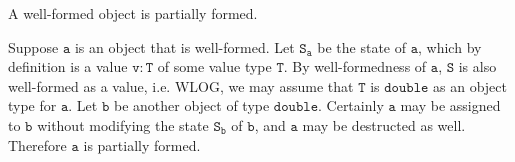 \begin{Lemma}
    A well-formed object is partially formed.
\end{Lemma}

\begin{solution}
    Suppose $\mathtt{a}$ is an object that is well-formed. Let $\mathtt{S_{a}}$ 
    be the state of $\mathtt{a}$, which by definition is a value $\mathtt{v} : 
    \mathtt{T}$ of some value type $\mathtt{T}$. By well-formedness of 
    $\mathtt{a}$, $\mathtt{S}$ is also well-formed as a value, i.e. WLOG, 
    we may assume that $\mathtt{T}$ is $\mathtt{double}$ as an object type 
    for $\mathtt{a}$. Let $\mathtt{b}$ be another object of type $\mathtt{double}$. 
    Certainly $\mathtt{a}$ may be assigned to $\mathtt{b}$ without modifying the 
    state $\mathtt{S_{b}}$ of $\mathtt{b}$, and $\mathtt{a}$ may be destructed as well. 
    Therefore $\mathtt{a}$ is partially formed.
\end{solution}